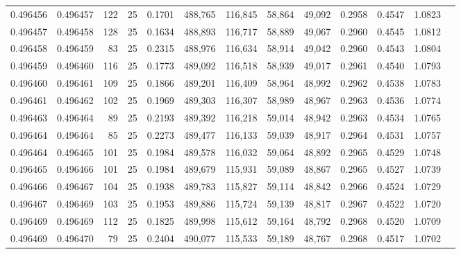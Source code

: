 \begin{tabular}{rrrrrrrrrrrrr}
0.496456 & 0.496457 &   122 &  25 &                                     0.1701 & 488,765 & 116,845 &  58,864 &  49,092 & 0.2958 & 0.4547 & 1.0823 \\
0.496457 & 0.496458 &   128 &  25 &                                     0.1634 & 488,893 & 116,717 &  58,889 &  49,067 & 0.2960 & 0.4545 & 1.0812 \\
0.496458 & 0.496459 &    83 &  25 &                                     0.2315 & 488,976 & 116,634 &  58,914 &  49,042 & 0.2960 & 0.4543 & 1.0804 \\
0.496459 & 0.496460 &   116 &  25 &                                     0.1773 & 489,092 & 116,518 &  58,939 &  49,017 & 0.2961 & 0.4540 & 1.0793 \\
0.496460 & 0.496461 &   109 &  25 &                                     0.1866 & 489,201 & 116,409 &  58,964 &  48,992 & 0.2962 & 0.4538 & 1.0783 \\
0.496461 & 0.496462 &   102 &  25 &                                     0.1969 & 489,303 & 116,307 &  58,989 &  48,967 & 0.2963 & 0.4536 & 1.0774 \\
0.496463 & 0.496464 &    89 &  25 &                                     0.2193 & 489,392 & 116,218 &  59,014 &  48,942 & 0.2963 & 0.4534 & 1.0765 \\
0.496464 & 0.496464 &    85 &  25 &                                     0.2273 & 489,477 & 116,133 &  59,039 &  48,917 & 0.2964 & 0.4531 & 1.0757 \\
0.496464 & 0.496465 &   101 &  25 &                                     0.1984 & 489,578 & 116,032 &  59,064 &  48,892 & 0.2965 & 0.4529 & 1.0748 \\
0.496465 & 0.496466 &   101 &  25 &                                     0.1984 & 489,679 & 115,931 &  59,089 &  48,867 & 0.2965 & 0.4527 & 1.0739 \\
0.496466 & 0.496467 &   104 &  25 &                                     0.1938 & 489,783 & 115,827 &  59,114 &  48,842 & 0.2966 & 0.4524 & 1.0729 \\
0.496467 & 0.496469 &   103 &  25 &                                     0.1953 & 489,886 & 115,724 &  59,139 &  48,817 & 0.2967 & 0.4522 & 1.0720 \\
0.496469 & 0.496469 &   112 &  25 &                                     0.1825 & 489,998 & 115,612 &  59,164 &  48,792 & 0.2968 & 0.4520 & 1.0709 \\
0.496469 & 0.496470 &    79 &  25 &                                     0.2404 & 490,077 & 115,533 &  59,189 &  48,767 & 0.2968 & 0.4517 & 1.0702 \\

\end{tabular}
